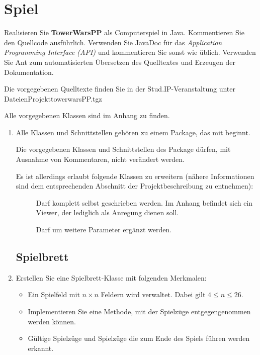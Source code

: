 \section*{Spiel}
Realisieren Sie \textbf{TowerWarsPP} als Computerspiel in Java. Kommentieren Sie den Quellcode ausführlich. Verwenden Sie JavaDoc für das \emph{Application Programming Interface (API)} und kommentieren Sie sonst wie üblich. Verwenden Sie Ant zum automatisierten Übersetzen des Quelltextes und Erzeugen der Dokumentation.

Die vorgegebenen Quelltexte finden Sie in der Stud.IP-Veranstaltung unter \\
Dateien\textrightarrow Projekt\textrightarrow towerwarsPP.tgz

Alle vorgegebenen Klassen sind im Anhang zu finden.

\begin{enumerate}
\item Alle Klassen und Schnittstellen gehören zu einem Package, das mit  beginnt.

Die vorgegebenen Klassen und Schnittstellen des Package  dürfen, mit Ausnahme von Kommentaren, nicht verändert werden. 

Es ist allerdings erlaubt folgende Klassen zu erweitern (nähere Informationen sind dem entsprechenden Abschnitt der Projektbeschreibung zu entnehmen):
\begin{description}
\item[] Darf komplett selbst geschrieben werden. Im Anhang befindet sich ein Viewer, der lediglich als Anregung dienen soll.
\item[] Darf um weitere Parameter ergänzt werden.
\end{description}

\newpage
\subsection*{Spielbrett}

\item Erstellen Sie eine Spielbrett-Klasse mit folgenden Merkmalen:
\begin{itemize}
\item Ein Spielfeld mit $n \times n$ Feldern wird verwaltet. Dabei gilt $4 \le n \le 26$.
\item Implementieren Sie eine Methode, mit der Spielzüge entgegengenommen werden können.
\item Gültige Spielzüge und Spielzüge die zum Ende des Spiels führen werden erkannt.


\end{itemize}
\end{enumerate}
